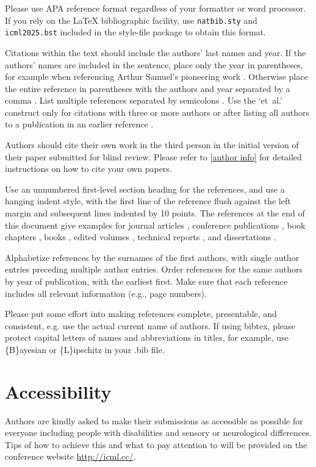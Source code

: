 \documentclass{article}
\theoremstyle{plain}
\theoremstyle{definition}
\theoremstyle{remark}
\begin{document}
Please use APA reference format regardless of your formatter
or word processor. If you rely on the \LaTeX\/ bibliographic
facility, use \texttt{natbib.sty} and \texttt{icml2025.bst}
included in the style-file package to obtain this format.

Citations within the text should include the authors' last names and
year. If the authors' names are included in the sentence, place only
the year in parentheses, for example when referencing Arthur Samuel's
pioneering work . Otherwise place the entire
reference in parentheses with the authors and year separated by a
comma \cite{Samuel59}. List multiple references separated by
semicolons \cite{kearns89,Samuel59,mitchell80}. Use the `et~al.'
construct only for citations with three or more authors or after
listing all authors to a publication in an earlier reference \cite{MachineLearningI}.

Authors should cite their own work in the third person
in the initial version of their paper submitted for blind review.
Please refer to \cref{author info} for detailed instructions on how to
cite your own papers.

Use an unnumbered first-level section heading for the references, and use a
hanging indent style, with the first line of the reference flush against the
left margin and subsequent lines indented by 10 points. The references at the
end of this document give examples for journal articles \cite{Samuel59},
conference publications \cite{langley00}, book chapters \cite{Newell81}, books
\cite{DudaHart2nd}, edited volumes \cite{MachineLearningI}, technical reports
\cite{mitchell80}, and dissertations \cite{kearns89}.

Alphabetize references by the surnames of the first authors, with
single author entries preceding multiple author entries. Order
references for the same authors by year of publication, with the
earliest first. Make sure that each reference includes all relevant
information (e.g., page numbers).

Please put some effort into making references complete, presentable, and
consistent, e.g. use the actual current name of authors.
If using bibtex, please protect capital letters of names and
abbreviations in titles, for example, use \{B\}ayesian or \{L\}ipschitz
in your .bib file.

\section*{Accessibility}
Authors are kindly asked to make their submissions as accessible as possible for everyone including people with disabilities and sensory or neurological differences.
Tips of how to achieve this and what to pay attention to will be provided on the conference website \url{http://icml.cc/}.
\end{document}
